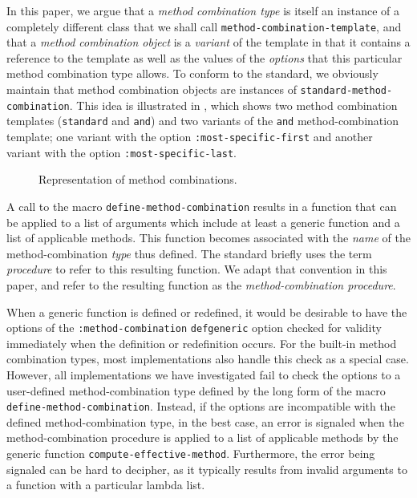 In this paper, we argue that a \emph{method combination type} is
itself an instance of a completely different class that we shall call
\texttt{method-combination-template}, and that a \emph{method
  combination object} is a \emph{variant} of the template in that it
contains a reference to the template as well as the values of the
\emph{options} that this particular method combination type allows.
To conform to the standard, we obviously maintain that method
combination objects are instances of
\texttt{standard-method-combination}.  This idea is illustrated in
, which shows two method combination
templates (\texttt{standard} and \texttt{and}) and two variants of the
\texttt{and} method-combination template; one variant with the option
\texttt{:most-specific-first} and another variant with the option
\texttt{:most-specific-last}.

\begin{figure}
\begin{center}
\end{center}
\caption{\label{fig-method-combinations}
Representation of method combinations.}
\end{figure}

A call to the macro \texttt{define-method-combination} results in a
function that can be applied to a list of arguments which include at
least a generic function and a list of applicable methods.  This
function becomes associated with the \emph{name} of the
method-combination \emph{type} thus defined.  The standard briefly
uses the term \emph{procedure} to refer to this resulting function.
We adapt that convention in this paper, and refer to the resulting
function as the \emph{method-combination procedure}.

When a generic function is defined or redefined, it would be desirable
to have the options of the \texttt{:method-combination}
\texttt{defgeneric} option checked for validity immediately when the
definition or redefinition occurs.  For the built-in method
combination types, most implementations also handle this check as a
special case.  However, all implementations we have investigated fail
to check the options to a user-defined method-combination type defined
by the long form of the macro \texttt{define-method-combination}.
Instead, if the options are incompatible with the defined
method-combination type, in the best case, an error is signaled when
the method-combination procedure is applied to a list of applicable
methods by the generic function \texttt{compute-effective-method}.
Furthermore, the error being signaled can be hard to decipher, as it
typically results from invalid arguments to a function with a
particular lambda list.

